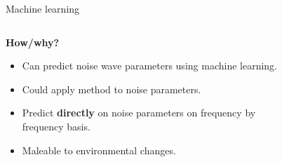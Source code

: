 \documentclass[aspectratio=169]{beamer}
\begin{document}
\begin{frame}{Machine learning}\footnotesize
	\begin{columns}
		\begin{column}{0.35\textwidth}
			\textbf{How/why?}
			\begin{itemize}
				\item Can predict noise wave parameters using machine learning.
				\item Could apply method to noise parameters.
				\item Predict \textbf{directly} on noise parameters on frequency by frequency basis.
				\item Maleable to environmental changes.
			\end{itemize}
		\end{column}
		\begin{column}{0.65\textwidth}
			\begin{figure}[h]
				
			\end{figure}
		\end{column}
	\end{columns}
\end{frame}
\end{document}
